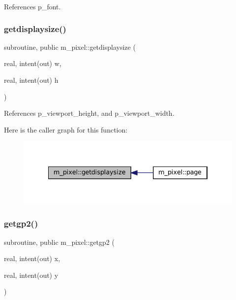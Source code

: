 References p\+\_\+font.

\mbox{\label{namespacem__pixel_acacbc4462423b9aa0f591cbe7aba4ec6}} 
\subsubsection{\texorpdfstring{getdisplaysize()}{getdisplaysize()}}
{\footnotesize\ttfamily subroutine, public m\+\_\+pixel\+::getdisplaysize (\begin{DoxyParamCaption}\item[{real, intent(out)}]{w,  }\item[{real, intent(out)}]{h }\end{DoxyParamCaption})}



References p\+\_\+viewport\+\_\+height, and p\+\_\+viewport\+\_\+width.

Here is the caller graph for this function\+:
\nopagebreak
\begin{figure}[H]
\begin{center}
\leavevmode
\includegraphics[width=334pt]{namespacem__pixel_acacbc4462423b9aa0f591cbe7aba4ec6_icgraph}
\end{center}
\end{figure}
\mbox{\label{namespacem__pixel_a626d769d3dae0c292e3ef1617ad43efb}} 
\subsubsection{\texorpdfstring{getgp2()}{getgp2()}}
{\footnotesize\ttfamily subroutine, public m\+\_\+pixel\+::getgp2 (\begin{DoxyParamCaption}\item[{real, intent(out)}]{x,  }\item[{real, intent(out)}]{y }\end{DoxyParamCaption})}




